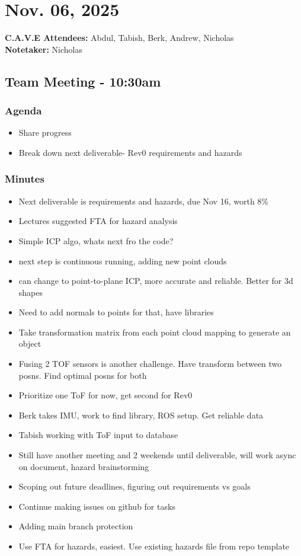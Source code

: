 	\pagebreak
	\section*{Nov. 06, 2025}

	\textbf{C.A.V.E Attendees:} Abdul, Tabish, Berk, Andrew, Nicholas\\
	\textbf{Notetaker:} Nicholas

	\subsection*{Team Meeting - 10:30am}
		\subsubsection*{Agenda}
			\begin{itemize}
				\item Share progress
				\item Break down next deliverable- Rev0 requirements and hazards
			\end{itemize}

		\subsubsection*{Minutes}
			\begin{itemize}
				\item Next deliverable is requirements and hazards, due Nov 16, worth 8\%
				\item Lectures suggested FTA for hazard analysis
				\item Simple ICP algo, whats next fro the code?
				\item next step is continuous running, adding new point clouds
				\item can change to point-to-plane ICP, more accurate and reliable. Better for 3d shapes
				\item Need to add normals to points for that, have libraries
				\item Take transformation matrix from each point cloud mapping to generate an object
				\item Fusing 2 TOF sensors is another challenge. Have transform between two posns. Find optimal posns for both
				\item Prioritize one ToF for now, get second for Rev0
				\item Berk takes IMU, work to find library, ROS setup. Get reliable data
				\item Tabish working with ToF input to database
				\item Still have another meeting and 2 weekends until deliverable, will work async on document, hazard brainstorming
				\item Scoping out future deadlines, figuring out requirements vs goals
				\item Continue making issues on github for tasks
				\item Adding main branch protection
				\item Use FTA for hazards, easiest. Use existing hazards file from repo template
			\end{itemize}

